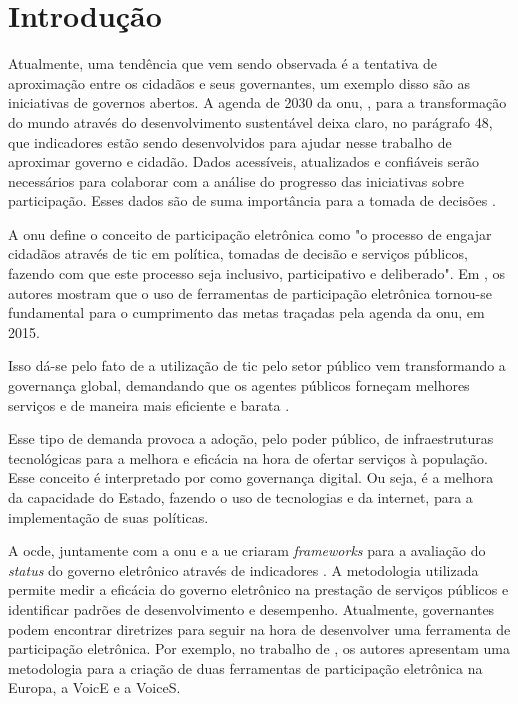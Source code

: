 \chapter[Introdução]{Introdução}
\label{cap:cap1}
Atualmente, uma tendência que vem sendo observada é a tentativa de aproximação entre os cidadãos e seus governantes, um exemplo disso são as iniciativas de governos abertos.
A agenda de 2030 da \acrfull{onu}, , para a transformação do mundo através do desenvolvimento sustentável deixa claro, no parágrafo 48, que
indicadores estão sendo desenvolvidos para ajudar nesse trabalho de aproximar governo e cidadão. Dados acessíveis, atualizados e confiáveis serão necessários para colaborar 
com a análise do progresso das iniciativas sobre participação. 
Esses dados são de suma importância para a tomada de decisões \cite{assembly2015transforming}.

\par
A \acrshort{onu} define o conceito de participação eletrônica como "o processo de engajar cidadãos através de \acrfull{tic} em política, tomadas de decisão e
serviços públicos, fazendo com que este processo seja inclusivo, participativo e deliberado". Em , os autores mostram que o uso de 
ferramentas de participação eletrônica tornou-se fundamental para o cumprimento das metas traçadas pela agenda da \acrshort{onu}, em 2015. 

\par
Isso dá-se pelo fato de a utilização de \acrshort{tic} pelo setor público vem transformando a governança global, demandando que os agentes públicos forneçam melhores serviços e 
de maneira mais eficiente e barata \cite{afdb2014uneca}. 

\par
Esse tipo de demanda provoca a adoção, pelo poder público, de infraestruturas tecnológicas para a melhora e eficácia na hora de ofertar serviços à população. Esse conceito é interpretado
por  como governança digital. Ou seja, é a melhora da capacidade do Estado, fazendo o uso de tecnologias e da internet, para a implementação de suas
políticas.

\par
A \acrfull{ocde}, juntamente com a \acrshort{onu} e a \acrfull{ue} criaram \textit{frameworks} para a avaliação do \textit{status} do governo eletrônico através de indicadores \cite{onu2018}. A metodologia utilizada permite medir a eficácia do governo eletrônico na prestação de serviços públicos e identificar padrões de desenvolvimento e desempenho.
Atualmente, governantes podem encontrar diretrizes para seguir na hora de desenvolver uma ferramenta de participação eletrônica. 
Por exemplo,  no trabalho de , os autores apresentam uma metodologia para a criação de duas ferramentas de participação eletrônica na Europa, a VoicE e a VoiceS.

